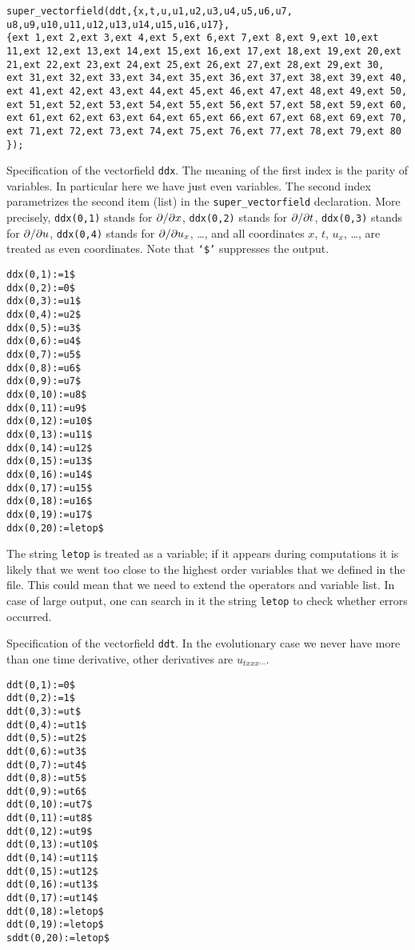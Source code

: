 \documentclass[12pt]{amsart}
\theoremstyle{definition}
\newcommand*{\pd}[2]{\mathchoice{\frac{\partial#1}{\partial#2}}
  {\partial#1/\partial#2}{\partial#1/\partial#2}
  {\partial#1/\partial#2}}
\begin{document}
\begin{verbatim}
super_vectorfield(ddt,{x,t,u,u1,u2,u3,u4,u5,u6,u7,
u8,u9,u10,u11,u12,u13,u14,u15,u16,u17},
{ext 1,ext 2,ext 3,ext 4,ext 5,ext 6,ext 7,ext 8,ext 9,ext 10,ext
11,ext 12,ext 13,ext 14,ext 15,ext 16,ext 17,ext 18,ext 19,ext 20,ext
21,ext 22,ext 23,ext 24,ext 25,ext 26,ext 27,ext 28,ext 29,ext 30,
ext 31,ext 32,ext 33,ext 34,ext 35,ext 36,ext 37,ext 38,ext 39,ext 40,
ext 41,ext 42,ext 43,ext 44,ext 45,ext 46,ext 47,ext 48,ext 49,ext 50,
ext 51,ext 52,ext 53,ext 54,ext 55,ext 56,ext 57,ext 58,ext 59,ext 60,
ext 61,ext 62,ext 63,ext 64,ext 65,ext 66,ext 67,ext 68,ext 69,ext 70,
ext 71,ext 72,ext 73,ext 74,ext 75,ext 76,ext 77,ext 78,ext 79,ext 80
});
\end{verbatim}

Specification of the vectorfield \texttt{ddx}.  The meaning of the first index
is the parity of variables.  In particular here we have just even variables.
The second index parametrizes the second item (list) in the
\texttt{super\_vectorfield} declaration. More precisely, \texttt{ddx(0,1)}
stands for $\pd{}{x}$, \texttt{ddx(0,2)} stands for $\pd{}{t}$,
\texttt{ddx(0,3)} stands for $\pd{}{u}$, \texttt{ddx(0,4)} stands for
$\pd{}{u_x}$, \dots, and all coordinates $x$, $t$, $u_x$, \dots, are treated as
even coordinates.  Note that \texttt{`\$'} suppresses the output.
\begin{verbatim}
ddx(0,1):=1$
ddx(0,2):=0$
ddx(0,3):=u1$
ddx(0,4):=u2$
ddx(0,5):=u3$
ddx(0,6):=u4$
ddx(0,7):=u5$
ddx(0,8):=u6$
ddx(0,9):=u7$
ddx(0,10):=u8$
ddx(0,11):=u9$
ddx(0,12):=u10$
ddx(0,13):=u11$
ddx(0,14):=u12$
ddx(0,15):=u13$
ddx(0,16):=u14$
ddx(0,17):=u15$
ddx(0,18):=u16$
ddx(0,19):=u17$
ddx(0,20):=letop$
\end{verbatim}
The string \texttt{letop} is treated as a variable; if it appears during
computations it is likely that we went too close to the highest order variables
that we defined in the file. This could mean that we need to extend the
operators and variable list. In case of large output, one can search in it the
string \texttt{letop} to check whether errors occurred.

Specification of the vectorfield \texttt{ddt}. In the evolutionary case we
never have more than one time derivative, other derivatives are
$u_{txxx\cdots}$.
\begin{verbatim}
ddt(0,1):=0$
ddt(0,2):=1$
ddt(0,3):=ut$
ddt(0,4):=ut1$
ddt(0,5):=ut2$
ddt(0,6):=ut3$
ddt(0,7):=ut4$
ddt(0,8):=ut5$
ddt(0,9):=ut6$
ddt(0,10):=ut7$
ddt(0,11):=ut8$
ddt(0,12):=ut9$
ddt(0,13):=ut10$
ddt(0,14):=ut11$
ddt(0,15):=ut12$
ddt(0,16):=ut13$
ddt(0,17):=ut14$
ddt(0,18):=letop$
ddt(0,19):=letop$
sddt(0,20):=letop$
\end{verbatim}
\end{document}
